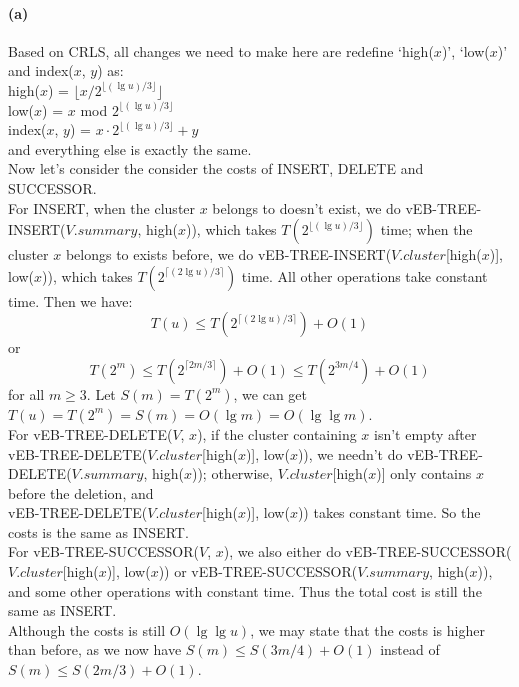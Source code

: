 \documentclass{6046}
\author{Lingfu Zhang}
\begin{document}
\paragraph{(a)}
Based on CRLS, 
all changes we need to make here 
are redefine `high($x$)', 
`low($x$)' and 
index($x$, $y$) as: 
\\

high($x$) = $\lfloor{x/
2^{\lfloor{(\lg{u})/3}\rfloor}
}\rfloor$ 
\\
low($x$) = $x$ mod 
$2^{\lfloor{(\lg{u})/3}\rfloor}$
\\
index($x$, $y$) = $x  
\cdot 2^{\lfloor{(\lg{u})/3}\rfloor}
+ y$
\\
and everything else is exactly the same. 
\\

Now let's consider the consider the 
costs of INSERT, DELETE and SUCCESSOR. 
\\
For INSERT, 
when the cluster $x$ belongs to 
doesn't exist, we do  
vEB-TREE-INSERT($V.summary$, high($x$)), 
which takes 
$T(2^{\lfloor{(\lg{u})/3}\rfloor})$
time; 
when the cluster $x$ belongs to 
exists before, we do 
vEB-TREE-INSERT($V.cluster$[high($x$)], low($x$)), 
which takes 
$T(2^{\lceil{(2\lg{u})/3}\rceil})$
time.  
All other operations take constant time. 
Then we have: 
$$T(u) \leq 
T(2^{\lceil{(2\lg{u})/3}\rceil}) + 
O(1)$$
or 
$$
T(2^m) \leq
T(2^{\lceil{2m/3}\rceil}) + O(1)
\leq
T(2^{3m/4}) + O(1)
$$
for all $m\geq 3$. 
Let $S(m) = T(2^m)$, 
we can get 
$T(u) = T(2^m) = S(m) = O(\lg{m}) = O(\lg{\lg{m}})$. 
\\

For vEB-TREE-DELETE($V$, $x$), 
if the cluster containing $x$ isn't 
empty after 
vEB-TREE-DELETE($V.cluster$[high($x$)], low($x$)), 
we needn't do 
vEB-TREE-DELETE($V.summary$, high($x$)); 
otherwise, 
$V.cluster$[high($x$)] only contains 
$x$ before the deletion, 
and 
\\
vEB-TREE-DELETE($V.cluster$[high($x$)], low($x$)) 
takes constant time. 
So the costs is the same as INSERT. 
\\

For vEB-TREE-SUCCESSOR($V$, $x$), 
we also either do 
vEB-TREE-SUCCESSOR($V.cluster$[high($x$)], low($x$)) 
or
vEB-TREE-SUCCESSOR($V.summary$, high($x$)), 
and some other operations with constant time. 
Thus the total cost is still the same as INSERT. 
\\

Although the costs is still $O(\lg{\lg{u}})$, 
we may state that the costs is higher than before, 
as we now have $S(m) \leq S(3m/4) + O(1)$ 
instead of $S(m) \leq S(2m/3) + O(1)$. 
\end{document}
